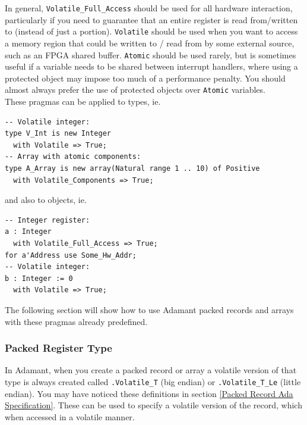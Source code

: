 In general, \texttt{Volatile\_Full\_Access} should be used for all hardware interaction, particularly if you need to guarantee that an entire register is read from/written to (instead of just a portion). \texttt{Volatile} should be used when you want to access a memory region that could be written to / read from by some external source, such as an FPGA shared buffer. \texttt{Atomic} should be used rarely, but is sometimes useful if a variable needs to be shared between interrupt handlers, where using a protected object may impose too much of a performance penalty. You should almost always prefer the use of protected objects over \texttt{Atomic} variables. \\

These pragmas can be applied to types, ie.

\vspace{5mm} %
\begin{verbatim}
-- Volatile integer:
type V_Int is new Integer 
  with Volatile => True;
-- Array with atomic components:
type A_Array is new array(Natural range 1 .. 10) of Positive 
  with Volatile_Components => True;
\end{verbatim}
\vspace{5mm} %

and also to objects, ie.

\vspace{5mm} %
\begin{verbatim}
-- Integer register:
a : Integer 
  with Volatile_Full_Access => True;
for a'Address use Some_Hw_Addr;
-- Volatile integer:
b : Integer := 0 
  with Volatile => True;
\end{verbatim}
\vspace{5mm} %

The following section will show how to use Adamant packed records and arrays with these pragmas already predefined.

\subsubsection{Packed Register Type}

In Adamant, when you create a packed record or array a volatile version of that type is always created called \texttt{.Volatile\_T} (big endian) or \texttt{.Volatile\_T\_Le} (little endian). You may have noticed these definitions in section \ref{Packed Record Ada Specification}. These can be used to specify a volatile version of the record, which when accessed in a volatile manner. \\

